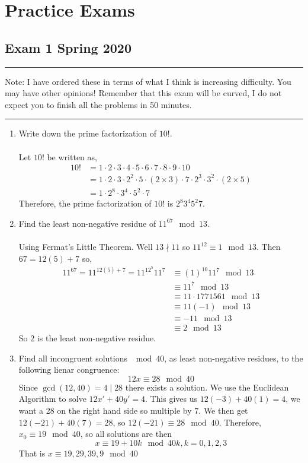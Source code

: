 \documentclass[class=article, crop=false]{standalone}
\begin{document}
\section{Practice Exams}

\subsection{Exam 1 Spring 2020}
\rule{\textwidth}{1pt}
Note: I have ordered these in terms of what I think is increasing difficulty.
You may have other opinions! Remember that this exam will be curved, I do not expect
you to finish all the problems in 50 minutes.\\
\rule{\textwidth}{1pt}
\begin{enumerate}[1.]
	\item Write down the prime factorization of $10!$. \\\\
	Let $10!$ be written as,
	\begin{align*}
		10! &= 1\cdot 2\cdot 3\cdot 4\cdot 5\cdot 6\cdot 7\cdot 8\cdot 9\cdot 10 \\
		&= 1\cdot 2\cdot 3\cdot 2^2\cdot 5\cdot (2\times 3)\cdot 7\cdot 2^3\cdot 3^2\cdot (2\times 5) \\
		&= 1\cdot 2^8\cdot 3^4\cdot 5^2\cdot 7
	\end{align*}
	Therefore, the prime factorization of $10!$ is $2^8 3^4 5^2 7$.
	
	\item Find the least non-negative residue of $11^{67} \mod 13$. \\\\
	Using Fermat's Little Theorem. 
	Well $13\nmid 11$ so $11^{12} \equiv 1\mod 13$. Then $67= 12(5) + 7$ so,
	\begin{align*}
		11^{67} = 11^{12(5)+7} = 11^{12^5}11^7 &\equiv (1)^{10} 11^{7} \mod 13 \\
		&\equiv 11^7 \mod 13 \\
		&\equiv 11 \cdot 1771561 \mod 13 \\
		&\equiv 11 (-1) \mod 13 \\
		&\equiv -11 \mod 13 \\
		&\equiv 2 \mod 13
	\end{align*}
	So $2$ is the least non-negative residue.
	
	\item Find all incongruent solutions $\mod 40$, as least non-negative residues,
	to the following lienar congruence: $$12x\equiv 28\mod 40$$
	Since $\gcd(12,40)=4\mid 28$ there exists a solution. We use the Euclidean Algorithm to solve
	$12x' + 40y' = 4$. This gives us $12(-3)+40(1)=4$, we want a 28 on the right hand side so 
	multiple by $7$. We then get $12(-21)+40(7)=28$, so $12(-21)\equiv 28\mod 40$. Therefore,
	$x_0 \equiv 19\mod 40$, so all solutions are then
	$$x\equiv 19 + 10k\mod 40k, k=0,1,2,3$$
	That is $x\equiv 19, 29, 39, 9\mod 40$


\end{enumerate}
\end{document}
